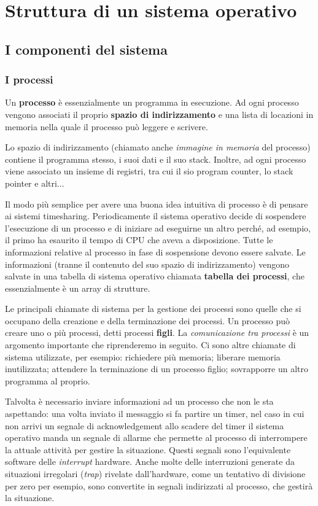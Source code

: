 \chapter{Struttura di un sistema operativo}
\thispagestyle{empty}

\section{I componenti del sistema}

\subsection{I processi}

Un \textbf{processo} è essenzialmente un programma in esecuzione. Ad ogni processo vengono associati il proprio \textbf{spazio di indirizzamento} e una lista di locazioni in memoria nella quale il processo può leggere e scrivere.

Lo spazio di indirizzamento (chiamato anche \textit{immagine in memoria} del processo) contiene il programma stesso, i suoi dati e il suo stack.
Inoltre, ad ogni processo viene associato un insieme di registri, tra cui il sio program counter, lo stack pointer e altri...

Il modo più semplice per avere una buona idea intuitiva di processo è di pensare ai sistemi timesharing. Periodicamente il sistema operativo decide di sospendere l'esecuzione di un processo e di iniziare ad eseguirne un altro perché, ad esempio, il primo ha esaurito il tempo di CPU che aveva a disposizione.
Tutte le informazioni relative al processo in fase di sospensione devono essere salvate. Le informazioni (tranne il contenuto del suo spazio di indirizzamento) vengono salvate in una tabella di sistema operativo chiamata \textbf{tabella dei processi}, che essenzialmente è un array di strutture. 

Le principali chiamate di sistema per la gestione dei processi sono quelle che si occupano della creazione e della terminazione dei processi.
Un processo può creare uno o più processi, detti processi \textbf{figli}. La \textit{comunicazione tra processi} è un argomento importante che riprenderemo in seguito. Ci sono altre chiamate di sistema utilizzate, per esempio: richiedere più memoria; liberare memoria inutilizzata; attendere la terminazione di un processo figlio; sovrapporre un altro programma al proprio.

Talvolta è necessario inviare informazioni ad un processo che non le sta aspettando: una volta inviato il messaggio si fa partire un timer, nel caso in cui non arrivi un segnale di acknowledgement allo scadere del timer il sistema operativo manda un segnale di allarme che permette al processo di interrompere la attuale attività per gestire la situazione. Questi segnali sono l'equivalente software delle \textit{interrupt} hardware. Anche molte delle interruzioni generate da situazioni irregolari (\textit{trap}) rivelate dall'hardware, come un tentativo di divisione per zero per esempio, sono convertite in segnali indirizzati al processo, che gestirà la situazione.

